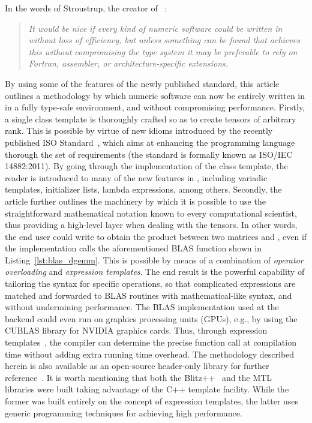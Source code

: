 \documentclass[11pt]{article}
\def\ifmonospace{\ifdim\fontdimen3\font=0pt }
\def\C++{\ifmonospace C++\else C\kern-.1667em\raise.50ex\hbox{\tiny{\textbf{+}\kern-.1em\textbf{+}}}\fi \spacefactor1000 }
\def\CPP11{\ifmonospace C++11\else C\kern-.1667em\raise.50ex\hbox{\tiny{\textbf{+}\kern-.1em\textbf{+}}}\kern-.1em11\fi \spacefactor1000 }
\newcommand{\code}[1]{{\footnotesize\ttfamily{#1}}}
\begin{document}
In the words of Stroustrup, the creator of \C++~\cite{Stroustrup:1994}:
\begin{quote}
\emph{It would be nice if every kind of numeric software could be written in \C++ without loss of efficiency, but unless something can be found that achieves this without compromising the \C++ type system it may be preferable to rely on Fortran, assembler, or architecture-specific extensions.}
\end{quote}
By using some of the features of the newly published \C++ standard, 
this article outlines a methodology by which numeric software can now be entirely written in \C++ in a fully type-safe environment, and without compromising performance.
Firstly, a single \code{Array} class template
is thoroughly crafted so as to create tensors of arbitrary rank. This is possible by virtue of new idioms introduced by the recently published \C++ ISO Standard~\cite{C++11}, which aims at enhancing the programming language thorough the set of \CPP11 requirements (the standard is formally known as ISO/IEC 14882:2011).
By going through the implementation of the \code{Array} class template, the reader is introduced to many of the new features in \CPP11, including variadic templates, initializer lists, lambda expressions, among others.
Secondly, the article further outlines the machinery by which it is possible to use the straightforward mathematical notation known to every computational scientist, thus providing a high-level layer when dealing with the tensors.
In other words, the end user could write \code{C=A*B} to obtain the product between two matrices \code{A} and \code{B}, even if the implementation calls the aforementioned BLAS function shown in Listing~\ref{lst:blas_dgemm}. This is possible by means of a combination of \emph{operator overloading} and \emph{expression templates}.
The end result is the powerful capability of tailoring the syntax for specific operations, so that complicated expressions are matched and forwarded to BLAS routines with mathematical-like syntax, and without undermining performance.
The BLAS implementation used at the backend could even run on graphics processing units (GPUs), e.g., by using the CUBLAS library for NVIDIA graphics cards.
Thus, through expression templates~\cite{Veldhuizen:1995}, the compiler can determine the precise function call at compilation time without adding extra running time overhead.
The methodology described herein is also available as an open-source header-only library for further reference~\cite{Aragon:2011}.
It is worth mentioning that both the Blitz++~\cite{Veldhuizen:1998} and the MTL~\cite{Gottschling:2007} \C++ libraries were built taking advantage of the C++ template facility. While the former was built entirely on the concept of expression templates, the latter uses generic programming techniques for achieving high performance.
\end{document}
